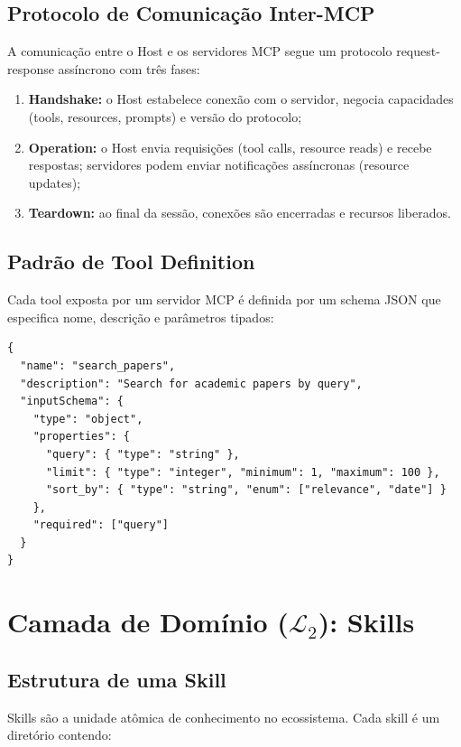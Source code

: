 \documentclass[12pt,a4paper,sumario=tradicional]{abntex2}
\begin{document}
\subsection{Protocolo de Comunicação Inter-MCP}

A comunicação entre o Host e os servidores MCP segue um protocolo request-response assíncrono com três fases:

\begin{enumerate}[leftmargin=*]
    \item \textbf{Handshake:} o Host estabelece conexão com o servidor, negocia capacidades (tools, resources, prompts) e versão do protocolo;
    \item \textbf{Operation:} o Host envia requisições (tool calls, resource reads) e recebe respostas; servidores podem enviar notificações assíncronas (resource updates);
    \item \textbf{Teardown:} ao final da sessão, conexões são encerradas e recursos liberados.
\end{enumerate}

\subsection{Padrão de Tool Definition}

Cada tool exposta por um servidor MCP é definida por um schema JSON que especifica nome, descrição e parâmetros tipados:

\begin{lstlisting}[language={}]
{
  "name": "search_papers",
  "description": "Search for academic papers by query",
  "inputSchema": {
    "type": "object",
    "properties": {
      "query": { "type": "string" },
      "limit": { "type": "integer", "minimum": 1, "maximum": 100 },
      "sort_by": { "type": "string", "enum": ["relevance", "date"] }
    },
    "required": ["query"]
  }
}
\end{lstlisting}

\section{Camada de Domínio ($\mathcal{L}_2$): Skills}

\subsection{Estrutura de uma Skill}

Skills são a unidade atômica de conhecimento no ecossistema. Cada skill é um diretório contendo:
\end{document}
